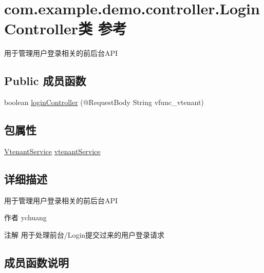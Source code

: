 \hypertarget{classcom_1_1example_1_1demo_1_1controller_1_1_login_controller}{}\section{com.\+example.\+demo.\+controller.\+Login\+Controller类 参考}
\label{classcom_1_1example_1_1demo_1_1controller_1_1_login_controller}


用于管理用户登录相关的前后台\+A\+PI  


\subsection*{Public 成员函数}
\begin{DoxyCompactItemize}
\item 
boolean \mbox{\hyperlink{classcom_1_1example_1_1demo_1_1controller_1_1_login_controller_abf808a4791ff614863af74fe97e5c6ca}{login\+Controller}} (@Request\+Body String vfunc\+\_\+vtenant)
\end{DoxyCompactItemize}
\subsection*{包属性}
\begin{DoxyCompactItemize}
\item 
\mbox{\hyperlink{classcom_1_1example_1_1demo_1_1service_1_1_vtenant_service}{Vtenant\+Service}} \mbox{\hyperlink{classcom_1_1example_1_1demo_1_1controller_1_1_login_controller_a8b4e3860cf4b4d59ea68634cfd6f1d33}{vtenant\+Service}}
\end{DoxyCompactItemize}


\subsection{详细描述}
用于管理用户登录相关的前后台\+A\+PI 

\begin{DoxyAuthor}{作者}
ychuang 
\end{DoxyAuthor}
\begin{DoxyNote}{注解}
用于处理前台/\+Login提交过来的用户登录请求 
\end{DoxyNote}


\subsection{成员函数说明}
\mbox{\label{classcom_1_1example_1_1demo_1_1controller_1_1_login_controller_abf808a4791ff614863af74fe97e5c6ca}} 
